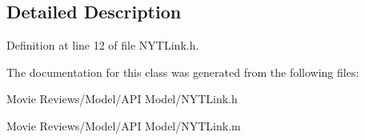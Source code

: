 \subsection{Detailed Description}


Definition at line 12 of file N\+Y\+T\+Link.\+h.



The documentation for this class was generated from the following files\+:\begin{DoxyCompactItemize}
\item 
Movie Reviews/\+Model/\+A\+P\+I Model/N\+Y\+T\+Link.\+h\item 
Movie Reviews/\+Model/\+A\+P\+I Model/N\+Y\+T\+Link.\+m\end{DoxyCompactItemize}
